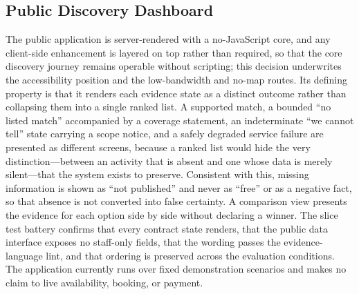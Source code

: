 \subsection{Public Discovery Dashboard}
\label{sec:public}
The public application is server-rendered with a no-JavaScript core, and any client-side enhancement is
layered on top rather than required, so that the core discovery journey remains operable without
scripting; this decision underwrites the accessibility position and the low-bandwidth and no-map routes.
Its defining property is that it renders each evidence state as a distinct outcome rather than collapsing
them into a single ranked list. A supported match, a bounded ``no listed match'' accompanied by a
coverage statement, an indeterminate ``we cannot tell'' state carrying a scope notice, and a safely
degraded service failure are presented as different screens, because a ranked list would hide the very
distinction---between an activity that is absent and one whose data is merely silent---that the system
exists to preserve. Consistent with this, missing information is shown as ``not published'' and never as
``free'' or as a negative fact, so that absence is not converted into false certainty. A comparison view
presents the evidence for each option side by side without declaring a winner. The slice test battery
confirms that every contract state renders, that the public data interface exposes no staff-only fields,
that the wording passes the evidence-language lint, and that ordering is preserved across the evaluation
conditions. The application currently runs over fixed demonstration scenarios and makes no claim to live
availability, booking, or payment.

